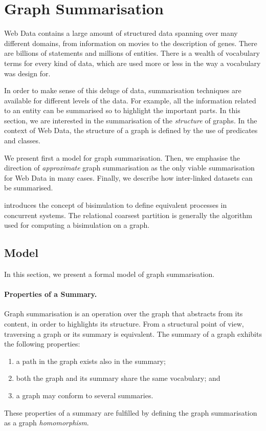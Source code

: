 \section{Graph Summarisation}
\label{chap:summary:model}

Web Data contains a large amount of structured data spanning over many different domains, from information on movies to the description of genes. There are billions of statements and millions of entities. There is a wealth of vocabulary terms for every kind of data, which are used more or less in the way a vocabulary was design for.

In order to make sense of this deluge of data, summarisation techniques are available for different levels of the data. For example, all the information related to an entity can be summarised so to highlight the important parts. In this section, we are interested in the summarisation of the \emph{structure} of graphs. In the context of Web Data, the structure of a graph is defined by the use of predicates and classes.

We present first a model for graph summarisation. Then, we emphasise the direction of \emph{approximate} graph summarisation as the only viable summarisation for Web Data in many cases. Finally, we describe how inter-linked datasets can be summarised.

\cite{Milner:1989:CC:534666} introduces the concept of bisimulation to define equivalent processes in concurrent systems. The relational coarsest partition \cite{Paige:1987:TPR:37185.37186} is generally the algorithm used for computing a bisimulation on a graph.

\subsection{Model}

In this section, we present a formal model of graph summarisation.

\paragraph{Properties of a Summary.}

Graph summarisation is an operation over the graph that abstracts from its content, in order to highlights its structure. From a structural point of view, traversing a graph or its summary is equivalent. The summary of a graph exhibits the following properties:
\begin{enumerate}
	\item a path in the graph exists also in the summary;
	\label{sprop-path}
	\item both the graph and its summary share the same vocabulary; and
	\label{sprop-voc}
	\item a graph may conform to several summaries.
	\label{sprop-not-uniq}
\end{enumerate}
These properties of a summary are fulfilled by defining the graph summarisation as a graph \emph{homomorphism}.

